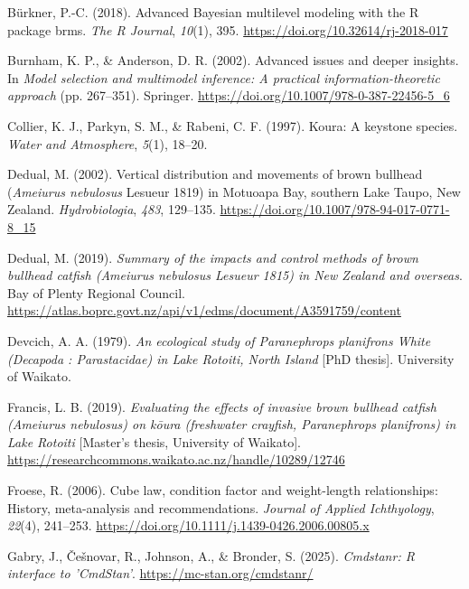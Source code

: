 \documentclass[
  letterpaper,
  DIV=11,
  numbers=noendperiod]{scrartcl}
\newlength{\cslhangindent}
\newenvironment{CSLReferences}[2] %
 {\begin{list}{}{%
  \setlength{\itemindent}{0pt}
  \setlength{\leftmargin}{0pt}
  \setlength{\parsep}{0pt}
  \ifodd #1
   \setlength{\leftmargin}{\cslhangindent}
   \setlength{\itemindent}{-1\cslhangindent}
  \fi
  \setlength{\itemsep}{#2\baselineskip}}}
 {\end{list}}
\begin{document}
\begin{CSLReferences}{1}{0}
Bürkner, P.-C. (2018). Advanced {B}ayesian multilevel modeling with the
{R} package brms. \emph{The R Journal}, \emph{10}(1), 395.
\url{https://doi.org/10.32614/rj-2018-017}

Burnham, K. P., \& Anderson, D. R. (2002). Advanced issues and deeper
insights. In \emph{Model selection and multimodel inference: A practical
information-theoretic approach} (pp. 267--351). Springer.
\url{https://doi.org/10.1007/978-0-387-22456-5_6}

Collier, K. J., Parkyn, S. M., \& Rabeni, C. F. (1997). Koura: A
keystone species. \emph{Water and Atmosphere}, \emph{5}(1), 18--20.

Dedual, M. (2002). Vertical distribution and movements of brown bullhead
({\emph{Ameiurus nebulosus}} {Lesueur} 1819) in {Motuoapa Bay}, southern
{Lake Taupo}, {New Zealand}. \emph{Hydrobiologia}, \emph{483}, 129--135.
\url{https://doi.org/10.1007/978-94-017-0771-8_15}

Dedual, M. (2019). \emph{Summary of the impacts and control methods of
brown bullhead catfish ({\emph{Ameiurus nebulosus}} {Lesueur} 1815) in
{New Zealand} and overseas}. Bay of Plenty Regional Council.
\url{https://atlas.boprc.govt.nz/api/v1/edms/document/A3591759/content}

Devcich, A. A. (1979). \emph{An ecological study of {\emph{Paranephrops
planifrons}} {White} ({Decapoda} : {Parastacidae}) in {Lake Rotoiti},
{North Island}} {[}PhD thesis{]}. University of Waikato.

Francis, L. B. (2019). \emph{Evaluating the effects of invasive brown
bullhead catfish ({\emph{Ameiurus nebulosus}}) on k{ō}ura (freshwater
crayfish, {\emph{Paranephrops planifrons}}) in {Lake Rotoiti}}
{[}Master's thesis, University of Waikato{]}.
\url{https://researchcommons.waikato.ac.nz/handle/10289/12746}

Froese, R. (2006). Cube law, condition factor and weight-length
relationships: History, meta-analysis and recommendations. \emph{Journal
of Applied Ichthyology}, \emph{22}(4), 241--253.
\url{https://doi.org/10.1111/j.1439-0426.2006.00805.x}

Gabry, J., Češnovar, R., Johnson, A., \& Bronder, S. (2025).
\emph{Cmdstanr: R interface to 'CmdStan'}.
\url{https://mc-stan.org/cmdstanr/}


\end{CSLReferences}
\end{document}
